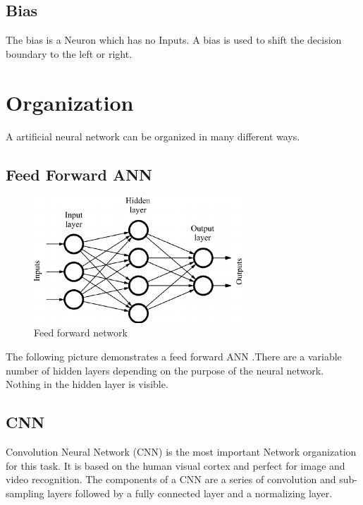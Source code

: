 \subsection{Bias}

The bias is a Neuron which has no Inputs. A bias is used to shift the decision boundary to the left or right.

\section{Organization}

A artificial neural network can be organized in many different ways.

\subsection{Feed Forward ANN}

\begin{figure}[h]
	\centering
	\includegraphics[width=0.7\textwidth]{./media/images/feed_forward_neural_network.png}
  	\caption{Feed forward network}
  	\label{ffNN}
\end{figure}

The following picture demonstrates a feed forward ANN .There are a variable number of hidden layers depending on the purpose of the neural network. Nothing in the hidden layer is visible. 

\subsection{CNN}

Convolution Neural Network (CNN) is the most important Network organization for this task. It is based on the human visual cortex and perfect for image and video recognition. The components of a CNN are a series of convolution and sub-sampling layers followed by a fully connected layer and a normalizing layer.

